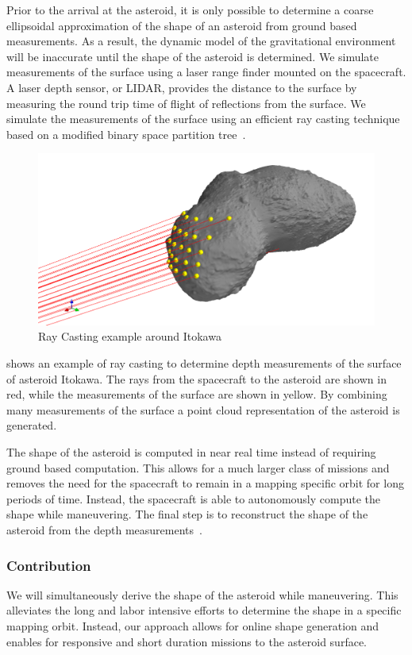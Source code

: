 \documentclass[11pt,reqno,twocolumn]{article} %
\begin{document}
Prior to the arrival at the asteroid, it is only possible to determine a coarse ellipsoidal approximation of the shape of an asteroid from ground based measurements. 
As a result, the dynamic model of the gravitational environment will be inaccurate until the shape of the asteroid is determined. 
We simulate measurements of the surface using a laser range finder mounted on the spacecraft.
A laser depth sensor, or LIDAR, provides the distance to the surface by measuring the round trip time of flight of reflections from the surface.
We simulate the measurements of the surface using an efficient ray casting technique based on a modified binary space partition tree~\cite{formella1995}.
\begin{figure}[htbp]
    \centering
    \includegraphics[width=\columnwidth]{figures/raycasting.png}
    \caption{Ray Casting example around Itokawa\label{fig:raycasting}}
\end{figure}
 shows an example of ray casting to determine depth measurements of the surface of asteroid Itokawa.
The rays from the spacecraft to the asteroid are shown in red, while the measurements of the surface are shown in yellow.
By combining many measurements of the surface a  point cloud representation of the asteroid is generated.

The shape of the asteroid is computed in near real time instead of requiring ground based computation.
This allows for a much larger class of missions and removes the need for the spacecraft to remain in a mapping specific orbit for long periods of time.
Instead, the spacecraft is able to autonomously compute the shape while maneuvering.
The final step is to reconstruct the shape of the asteroid from the depth measurements~\cite{hoppe1992}.
\subsubsection*{Contribution}
We will simultaneously derive the shape of the asteroid while maneuvering.
This alleviates the long and labor intensive efforts to determine the shape in a specific mapping orbit.
Instead, our approach allows for online shape generation and enables for responsive and short duration missions to the asteroid surface.


\end{document}
